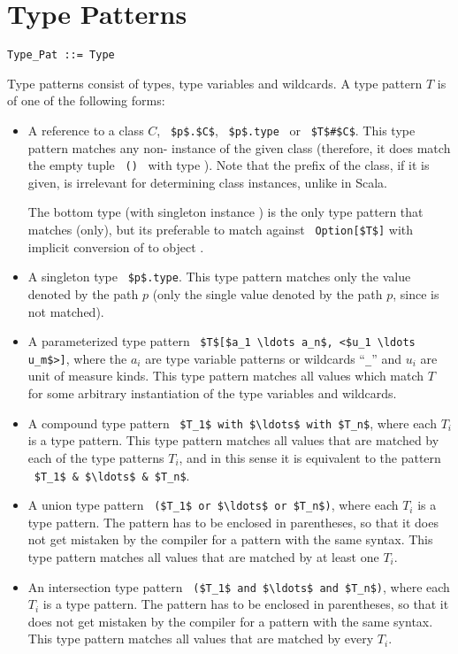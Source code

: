 \section{Type Patterns}
\label{sec:type-patterns}

\syntax\begin{lstlisting}
Type_Pat ::= Type
\end{lstlisting}

Type patterns consist of types, type variables and wildcards. A type pattern $T$ is of one of the following forms: 
\begin{itemize}
  \item[] A reference to a class $C$, ~\lstinline!$p$.$C$!, ~\lstinline!$p$.type!~ or ~\lstinline!$T$#$C$!. This type pattern matches any non- instance of the given class (therefore, it does match the empty tuple ~\lstinline!()!~ with type ). Note that the prefix of the class, if it is given, is irrelevant for determining class instances, unlike in Scala. 

  The bottom type  (with singleton instance ) is the only type pattern that matches  (only), but its preferable to match against ~\lstinline!Option[$T$]! with implicit conversion of  to object . 

  \item[] A singleton type ~\lstinline!$p$.type!. This type pattern matches only the value denoted by the path $p$ (only the single value denoted by the path $p$, since  is not matched). 

  \item[] A parameterized type pattern ~\lstinline!$T$[$a_1 \ldots a_n$, <$u_1 \ldots u_m$>]!, where the $a_i$ are type variable patterns or wildcards ``\lstinline!_!'' and $u_i$ are unit of measure kinds. This type pattern matches all values which match $T$ for some arbitrary instantiation of the type variables and wildcards.  

  \item[] A compound type pattern ~\lstinline!$T_1$ with $\ldots$ with $T_n$!, where each $T_i$ is a type pattern. This type pattern matches all values that are matched by each of the type patterns $T_i$, and in this sense it is equivalent to the pattern ~\lstinline!$T_1$ & $\ldots$ & $T_n$!. 

  \item[] A union type pattern ~\lstinline!($T_1$ or $\ldots$ or $T_n$)!, where each $T_i$ is a type pattern. The pattern has to be enclosed in parentheses, so that it does not get mistaken by the compiler for a pattern with the same syntax. This type pattern matches all values that are matched by at least one $T_i$. 

  \item[] An intersection type pattern ~\lstinline!($T_1$ and $\ldots$ and $T_n$)!, where each $T_i$ is a type pattern. The pattern has to be enclosed in parentheses, so that it does not get mistaken by the compiler for a pattern with the same syntax. This type pattern matches all values that are matched by every $T_i$. 
\end{itemize}

